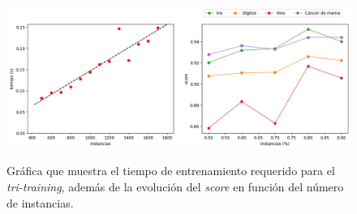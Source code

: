 \begin{figure}[h]
	\caption[\textit{Tri-training}: resultados (tiempo-porcentaje)]{Gráfica que muestra el tiempo de entrenamiento requerido para el \textit{tri-training}, además de la evolución del \textit{score} en función del número de instancias.}
	\centering
	\includegraphics[scale=0.4]{../img/memoria/5_tritraining_time-percentage}
	\label{gr:tt_time-percentage}
\end{figure}

